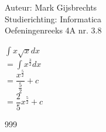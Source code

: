 \documentclass[a4paper]{article}
\newcommand{\dint}{\displaystyle\int}
\begin{document}
\noindent \large Auteur: Mark Gijsbrechts \\
\noindent \large Studierichting: Informatica\\
\noindent \large Oefeningenreeks 4A nr. 3.8\\

\medskip

\normalsize





$ \dint x \sqrt{x} dx $ \\

$= \dint x^{\tfrac{3}{2}} dx $ \\

$=  \dfrac{x^{\tfrac{5}{2}}}{\tfrac{5}{2}} + c $ \\
 
$= \dfrac{2}{5} x^{\tfrac{5}{2}} + c $ \\



\begin{thebibliography}{999}
\end{thebibliography}
\end{document}
